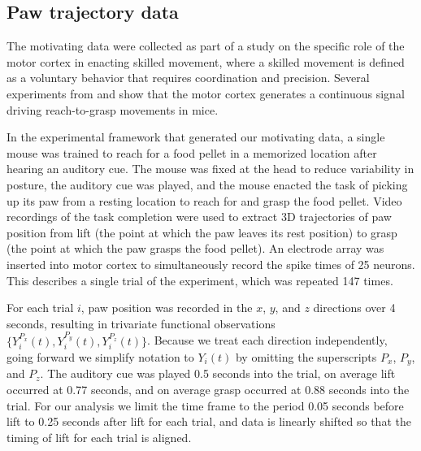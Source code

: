 \documentclass[preprint]{JASA}
\begin{document}
\hypertarget{paw-trajectory-data}{%
\subsection{Paw trajectory data}\label{paw-trajectory-data}}

\label{sec:data}

The motivating data were collected as part of a study on the specific
role of the motor cortex in enacting skilled movement, where a skilled
movement is defined as a voluntary behavior that requires coordination
and precision. Several experiments from \cite{guo2015} and
\cite{sauerbrei2018} show that the motor cortex generates a continuous
signal driving reach-to-grasp movements in mice.

In the experimental framework that generated our motivating data, a
single mouse was trained to reach for a food pellet in a memorized
location after hearing an auditory cue. The mouse was fixed at the head
to reduce variability in posture, the auditory cue was played, and the
mouse enacted the task of picking up its paw from a resting location to
reach for and grasp the food pellet. Video recordings of the task
completion were used to extract 3D trajectories of paw position from
lift (the point at which the paw leaves its rest position) to grasp (the
point at which the paw grasps the food pellet). An electrode array was
inserted into motor cortex to simultaneously record the spike times of
25 neurons. This describes a single trial of the experiment, which was
repeated 147 times.

For each trial \(i\), paw position was recorded in the \(x\), \(y\), and
\(z\) directions over 4 seconds, resulting in trivariate functional
observations \(\{ Y_i^{P_x}(t), Y_i^{P_y}(t), Y_i^{P_z}(t)\}\). Because
we treat each direction independently, going forward we simplify
notation to \(Y_i(t)\) by omitting the superscripts \(P_x\), \(P_y\),
and \(P_z\). The auditory cue was played 0.5 seconds into the trial, on
average lift occurred at 0.77 seconds, and on average grasp occurred at
0.88 seconds into the trial. For our analysis we limit the time frame to
the period 0.05 seconds before lift to 0.25 seconds after lift for each
trial, and data is linearly shifted so that the timing of lift for each
trial is aligned.
\end{document}
